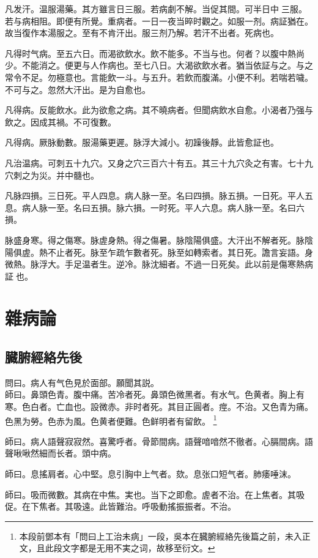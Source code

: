 凡发汗。温服湯藥。其方雖言日三服。若病劇不解。当促其間。可半日中{\sungtpii 𥁞}三服。若与病相阻。即便有所覺。重病者。一日一夜当晬时觀之。如服一剂。病証猶在。故当復作本湯服之。至有不肯汗出。服三剂乃解。若汗不出者。死病也。

凡得时气病。至五六日。而渴欲飲水。飲不能多。不当与也。何者？以腹中熱尚少。不能消之。便更与人作病也。至七八日。大渴欲飲水者。猶当依証与之。与之常令不足。勿極意也。言能飲一斗。与五升。若飲而腹滿。小便不利。若喘若噦。不可与之。忽然大汗出。是为自愈也。

凡得病。反能飲水。此为欲愈之病。其不曉病者。但聞病飲水自愈。小渴者乃强与飲之。因成其禍。不可復數。

凡得病。厥脉動數。服湯藥更遲。脉浮大減小。初躁後靜。此皆愈証也。

凡治温病。可刺五十九穴。又身之穴三百六十有五。其三十九穴灸之有害。七十九穴刺之为災。并中髓也。

凡脉四損。三日死。平人四息。病人脉一至。名曰四損。脉五損。一日死。平人五息。病人脉一至。名曰五損。脉六損。一时死。平人六息。病人脉一至。名曰六損。

脉盛身寒。得之傷寒。脉虗身熱。得之傷暑。脉陰陽俱盛。大汗出不解者死。脉陰陽俱虗。熱不止者死。脉至乍疏乍數者死。脉至如轉索者。其日死。譫言妄語。身微熱。脉浮大。手足温者生。逆冷。脉沈細者。不過一日死矣。此以前是傷寒熱病証{\sungtpii 𠊱}也。

\part{雜病論}

\chapter{臓腑經絡先後}

問曰。病人有气色見於面部。願聞其説。\\
師曰。鼻頭色青。腹中痛。苦冷者死。鼻頭色微黑者。有水气。色黄者。胸上有寒。色白者。亡血也。設微赤。非时者死。其目正圓者。痙。不治。又色青为痛。色黑为勞。色赤为風。色黄者便難。色鲜明者有留飲。
	\footnote{
		本段前鄧本有「問曰上工治未病」一段，吳本在臓腑經絡先後篇之前，未入正文，且此段文字都是无用不実之词，故移至衍文。
	}

師曰。病人語聲寂寂然。喜驚呼者。骨節間病。語聲喑喑然不徹者。心膈間病。語聲啾啾然細而长者。頭中病。

師曰。息搖肩者。心中堅。息引胸中上气者。欬。息张口短气者。肺痿唾沫。

師曰。吸而微數。其病在中焦。実也。当下之即愈。虗者不治。在上焦者。其吸促。在下焦者。其吸遠。此皆難治。呼吸動搖振振者。不治。

